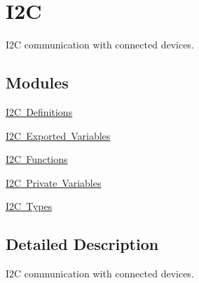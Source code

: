 \hypertarget{group___s_d___i2_c}{}\section{I2C}
\label{group___s_d___i2_c}


I2C communication with connected devices.  


\subsection*{Modules}
\begin{DoxyCompactItemize}
\item 
\mbox{\hyperlink{group___s_d___i2_c___defines}{I2\+C Definitions}}
\item 
\mbox{\hyperlink{group___s_d___i2_c___exported___variables}{I2\+C Exported Variables}}
\item 
\mbox{\hyperlink{group___s_d___i2_c___functions}{I2\+C Functions}}
\item 
\mbox{\hyperlink{group___s_d___i2_c___private___variables}{I2\+C Private Variables}}
\item 
\mbox{\hyperlink{group___s_d___i2_c___types}{I2\+C Types}}
\end{DoxyCompactItemize}


\subsection{Detailed Description}
I2C communication with connected devices. 

